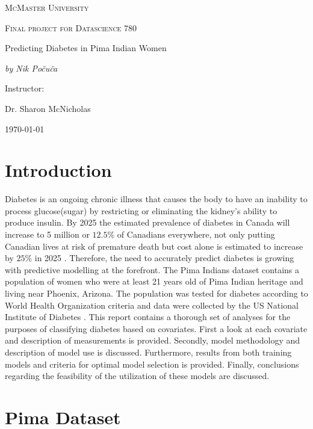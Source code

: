 \documentclass[11pt,letterpaper]{article}
\begin{document}
\begin{titlepage}
	\centering
	{\scshape\LARGE McMaster University \par}
	\vspace{1cm}
	{\scshape\Large Final project for Datascience 780\par}
	\vspace{1.5cm}
	{\huge Predicting Diabetes in  Pima Indian Women \par}
	\vspace{2cm}
	{\Large\itshape by Nik Po\v cu\v ca\par}
	\vfill
	Instructor:  \par
	Dr. Sharon McNicholas 

	\vfill

	{\large \today\par}
\end{titlepage}

\doublespacing

\section{Introduction}

Diabetes is an ongoing chronic illness that causes the body to have an inability to process glucose(sugar) by restricting or eliminating the kidney's ability to produce insulin. 
By 2025 the estimated prevalence of diabetes in Canada will increase to 5 million or $12.5 \%$ of Canadians everywhere, not only putting Canadian lives at risk of premature death but cost alone is estimated to increase by $25 \% $ in 2025 \citep{diabetes}. Therefore, the need to accurately predict diabetes is growing with predictive modelling at the forefront. The Pima Indians dataset contains a population of women who were at least 21 years old of Pima Indian heritage and living near Phoenix, Arizona. The population was tested for diabetes according to World Health Organization criteria and data were collected by the US National Institute of Diabetes \citep{pima}. This report contains a thorough set of analyses for the purposes of classifying diabetes based on covariates. First a look at each covariate and description of measurements is provided. Secondly, model methodology and description of model use is discussed. Furthermore, results from both training models and criteria for optimal model selection is provided. Finally, conclusions regarding the feasibility of the utilization of these models are discussed. 

\section{Pima Dataset}
\end{document}
